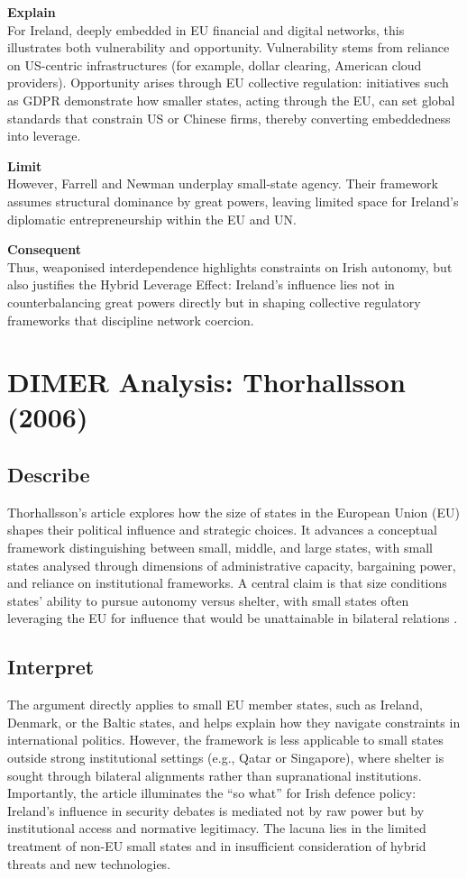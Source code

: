 \textbf{Explain} \\
For Ireland, deeply embedded in EU financial and digital networks, this illustrates both vulnerability and opportunity. Vulnerability stems from reliance on US-centric infrastructures (for example, dollar clearing, American cloud providers). Opportunity arises through EU collective regulation: initiatives such as GDPR demonstrate how smaller states, acting through the EU, can set global standards that constrain US or Chinese firms, thereby converting embeddedness into leverage.  

\textbf{Limit} \\
However, Farrell and Newman underplay small-state agency. Their framework assumes structural dominance by great powers, leaving limited space for Ireland’s diplomatic entrepreneurship within the EU and UN.  

\textbf{Consequent} \\
Thus, weaponised interdependence highlights constraints on Irish autonomy, but also justifies the Hybrid Leverage Effect: Ireland’s influence lies not in counterbalancing great powers directly but in shaping collective regulatory frameworks that discipline network coercion.  

\section*{DIMER Analysis: Thorhallsson (2006)}

\subsection*{Describe}
Thorhallsson’s article explores how the size of states in the European Union (EU) shapes their political influence and strategic choices. It advances a conceptual framework distinguishing between small, middle, and large states, with small states analysed through dimensions of administrative capacity, bargaining power, and reliance on institutional frameworks. A central claim is that size conditions states’ ability to pursue autonomy versus shelter, with small states often leveraging the EU for influence that would be unattainable in bilateral relations \parencite{THORHALLSSON_2006}.

\subsection*{Interpret}
The argument directly applies to small EU member states, such as Ireland, Denmark, or the Baltic states, and helps explain how they navigate constraints in international politics. However, the framework is less applicable to small states outside strong institutional settings (e.g., Qatar or Singapore), where shelter is sought through bilateral alignments rather than supranational institutions. Importantly, the article illuminates the “so what” for Irish defence policy: Ireland’s influence in security debates is mediated not by raw power but by institutional access and normative legitimacy. The lacuna lies in the limited treatment of non-EU small states and in insufficient consideration of hybrid threats and new technologies.

